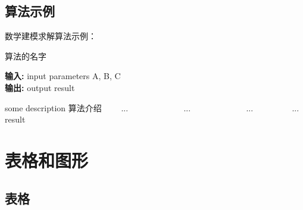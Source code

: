 \documentclass[bwprint,12pt,fontset=windows]{gmcmthesis}
\begin{document}
\subsection{算法示例}

数学建模求解算法示例：

\begin{center}
\begin{minipage}{0.8\textwidth}
\begin{algorithm}[H]%
\caption{算法的名字} %
{\bf 输入:} %
input parameters A, B, C\\
{\bf 输出:} %
output result
\begin{algorithmic}[1]
\State some description 算法介绍 %
　　\State ...
　　　　\State ...
　　\Else
　　　　\State ...
　　\EndIf
\EndFor
{} %
　　\State ...
\EndWhile
\State \Return result
\end{algorithmic}
\end{algorithm}
\end{minipage}
\end{center}


\section{表格和图形}

\subsection{表格}

\end{document}
